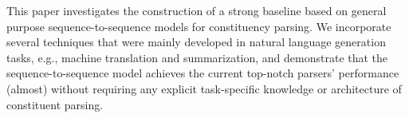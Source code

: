 This paper investigates the construction of a strong baseline based on general purpose sequence-to-sequence models for constituency parsing. We incorporate several techniques that were mainly developed in natural language generation tasks, e.g., machine translation and summarization, and demonstrate that the sequence-to-sequence model achieves the current top-notch parsers' performance (almost) without requiring any explicit task-specific knowledge or architecture of constituent parsing.
